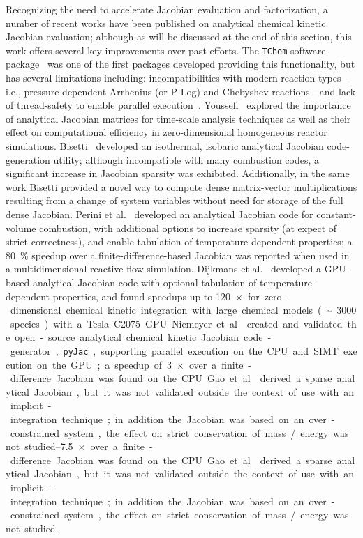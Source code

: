 \documentclass[12pt,number,sort&compress,preprint]{elsarticle}
\begin{document}
Recognizing the need to accelerate Jacobian evaluation and factorization, a number of recent works have been published on analytical chemical kinetic Jacobian evaluation; although as will be discussed at the end of this section, this work offers several key improvements over past efforts.
The \texttt{TChem} software package~\cite{Safta:2011vn} was one of the first packages developed providing this functionality, but has several limitations including: incompatibilities with modern reaction types---i.e., pressure dependent Arrhenius (or P-Log) and Chebyshev reactions---and lack of thread-safety to enable parallel execution~\cite{Curtis2017:tchem}. 
Youssefi~\cite{Youssefi:2011tm} explored the importance of analytical Jacobian matrices for time-scale analysis techniques as well as their effect on computational efficiency in zero-dimensional homogeneous reactor simulations.
Bisetti~\cite{Bisetti:2012jw} developed an isothermal, isobaric analytical Jacobian code-generation utility; although incompatible with many combustion codes, a significant increase in Jacobian sparsity was exhibited.
Additionally, in the same work Bisetti provided a novel way to compute dense matrix-vector multiplications resulting from a change of system variables without need for storage of the full dense Jacobian.
Perini et al.~\cite{Perini:2012gy} developed an analytical Jacobian code for constant-volume combustion, with additional options to increase sparsity (at expect of strict correctness), and enable tabulation of temperature dependent properties; a \SI{80}{\percent} speedup over a finite-difference-based Jacobian was reported when used in a multidimensional reactive-flow simulation.
Dijkmans et al.~\cite{Dijkmans:2014bb} developed a GPU-based analytical Jacobian code with optional tabulation of temperature-dependent properties, and found speedups up to \SI{120}{$\times$} for zero-dimensional chemical kinetic integration with large chemical models (\textasciitilde\num{3000} species) with a Tesla C2075 GPU.
Niemeyer et al.~\cite{Niemeyer:2016aa} created and validated the open-source analytical chemical kinetic Jacobian code-generator, \texttt{pyJac}, supporting parallel execution on the CPU and SIMT execution on the GPU; a speedup of \SIrange{3}{7.5}{$\times$} over a finite-difference Jacobian was found on the CPU.
Gao et al.~\cite{GAO2015287} derived a sparse analytical Jacobian, but it was not validated outside the context of use with an implicit-integration technique; in addition the Jacobian was based on an over-constrained system, the effect on strict conservation of mass\slash energy was not studied.
\end{document}
